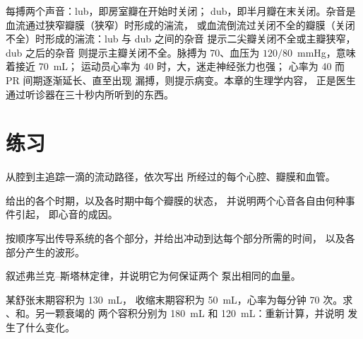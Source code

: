 \begin{example}[听诊心脏]\label{ex:b2:heart:reading}
每搏两个声音：lub，即房室瓣在开始时关闭；
dub，即半月瓣在末关闭。杂音是
血流通过狭窄瓣膜（狭窄）时形成的湍流，
或血流倒流过关闭不全的瓣膜（关闭不全）时形成的湍流：lub 与 dub 之间的杂音
提示二尖瓣关闭不全或主瓣狭窄，dub 之后的杂音
则提示主瓣关闭不全。脉搏为 70、血压为
$120/80$~mmHg，意味着接近 \qty{70}{mL}；
运动员心率为 40 时，大，迷走神经张力也强；
心率为 40 而 PR 间期逐渐延长、直至出现
漏搏，则提示病变。本章的生理学内容，
正是医生通过听诊器在三十秒内所听到的东西。
\end{example}

\section{练习}

\begin{exercise}[$\star$]\label{exo:b2:heart:1}
从腔到主追踪一滴的流动路径，依次写出
所经过的每个心腔、瓣膜和血管。
\end{exercise}

\begin{exercise}[$\star$]\label{exo:b2:heart:2}
给出的各个时期，以及各时期中每个瓣膜的状态，
并说明两个心音各自由何种事件引起，
即心音的成因。
\end{exercise}

\begin{exercise}[$\star$]\label{exo:b2:heart:3}
按顺序写出传导系统的各个部分，并给出冲动到达每个部分所需的时间，
以及各部分产生的波形。
\end{exercise}

\begin{exercise}[$\star$]\label{exo:b2:heart:4}
叙述弗兰克–斯塔林定律，并说明它为何保证两个
泵出相同的血量。
\end{exercise}

\begin{exercise}[$\star\star$]\label{exo:b2:heart:5}
某舒张末期容积为 \qty{130}{mL}，
收缩末期容积为 \qty{50}{mL}，心率为每分钟 70 次。求
、和。另一颗衰竭的
两个容积分别为 \qty{180}{mL} 和 \qty{120}{mL}：重新计算，并说明
发生了什么变化。
\end{exercise}

